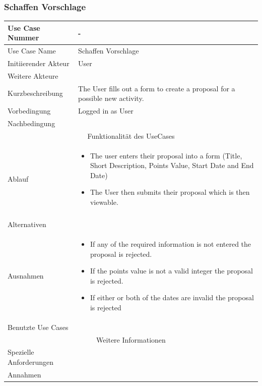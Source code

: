 \documentclass[10pt,a4paper]{article}
\begin{document}
	\subsubsection{Schaffen Vorschlage}
	\begin{tabular}{|l|p{.5\linewidth}|}
	\hline Use Case Nummer & - \\ 
	\hline Use Case Name & Schaffen Vorschlage \\ 
	\hline Initiierender Akteur & User \\
	\hline Weitere Akteure & \\
	\hline Kurzbeschreibung & The User fills out a form to create a proposal for a possible new activity. \\
	\hline Vorbedingung & Logged in as User \\
	\hline Nachbedingung &  \\
	\hline \multicolumn{2}{|c|}{Funktionalität des UseCases}\\
	\hline Ablauf & \begin{itemize}
			\item The user enters their proposal into a form (Title, Short Description, Points Value, Start Date and End Date)
			\item The User then submits their proposal which is then viewable.
		\end{itemize} \\ \\
	\hline Alternativen &  \\
	\hline Ausnahmen & \begin{itemize}
			\item If any of the required information is not entered the proposal is rejected.
			\item If the points value is not a valid integer the proposal is rejected.
			\item If either or both of the dates are invalid the proposal is rejected
		\end{itemize} \\
	\hline Benutzte Use Cases &  \\
	\hline \multicolumn{2}{|c|}{Weitere Informationen} \\
	\hline Spezielle Anforderungen &  \\
	\hline Annahmen &  \\
	\hline
	\end{tabular}
	
\end{document}
